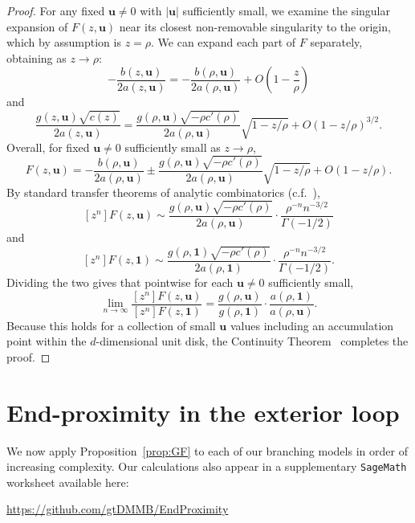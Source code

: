 \documentclass{article}
\begin{document}
\begin{proof}
    For any fixed $\mathbf{u} \neq 0$ with $|\mathbf{u}|$ sufficiently small, we examine the singular expansion of $F(z, \mathbf{u})$ near its closest non-removable singularity to the origin, which by assumption is $z = \rho$.  We can expand each part of $F$ separately, obtaining as $z \to \rho$:
    \[
    -\frac{b(z, \mathbf{u})}{2a(z, \mathbf{u})} = -\frac{b(\rho, \mathbf{u})}{2a(\rho, \mathbf{u})} + O\left(1 - \frac{z}{\rho}\right)
    \]
    and
    \[
    \frac{g(z, \mathbf{u})\sqrt{c(z)}}{2a(z, \mathbf{u})} = \frac{g(\rho, \mathbf{u}) \sqrt{-\rho c'(\rho)}}{2a(\rho, \mathbf{u})} \sqrt{1 - z/\rho} + O(1 - z/\rho)^{3/2}.
    \]
    Overall, for fixed $\mathbf{u} \neq 0$ sufficiently small as $z \to \rho$,
    \[
    F(z, \mathbf{u}) = -\frac{b(\rho, \mathbf{u})}{2a(\rho, \mathbf{u})} \pm \frac{g(\rho, \mathbf{u})\sqrt{-\rho c'(\rho)}}{2a(\rho, \mathbf{u})}\sqrt{1 - z/\rho} + O(1 - z/\rho).
    \]
    By standard transfer theorems of analytic combinatorics (c.f.~\cite[Corollary VI.1]{FlSe:2009}),
    \[
    [z^n] F(z, \mathbf{u}) \sim \frac{g(\rho, \mathbf{u})\sqrt{-\rho c'(\rho)}}{2a(\rho, \mathbf{u})} \cdot \frac{\rho^{-n}n^{-3/2}}{\Gamma(-1/2)}
    \]
    and
    \[
    [z^n] F(z, \mathbf{1}) \sim \frac{g(\rho, \mathbf{1}) \sqrt{-\rho c'(\rho)}}{2a(\rho, \mathbf{1})} \cdot \frac{\rho^{-n}n^{-3/2}}{\Gamma(-1/2)}.
    \]
    Dividing the two gives that pointwise for each $\mathbf{u} \neq 0$ sufficiently small,
    \[
    \lim_{n \to \infty} \frac{[z^n] F(z, \mathbf{u})}{[z^n] F(z, \mathbf{1})} = \frac{g(\rho, \mathbf{u})}{g(\rho, \mathbf{1})} \cdot \frac{a(\rho, \mathbf{1})}{a(\rho, \mathbf{u})}.
    \]
    Because this holds for a collection of small $\mathbf{u}$ values including an accumulation point within the $d$-dimensional unit disk, the Continuity Theorem~\cite[Theorem IX.1]{FlSe:2009} completes the proof.
\end{proof}


\section{End-proximity in the exterior loop} \label{sec:ModelAnalysis}

We now apply Proposition~\ref{prop:GF} to each of our branching models in order of increasing complexity.  Our calculations also appear in a supplementary {\tt SageMath} worksheet available here:
\begin{center}
    \url{https://github.com/gtDMMB/EndProximity}
\end{center}
\end{document}
